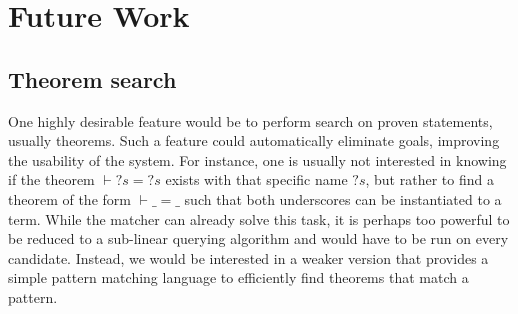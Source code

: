 \section{Future Work}
\label{sec:future-work}

% 

\subsection{Theorem search}

One highly desirable feature would be to perform search on proven statements, usually theorems. Such a feature could automatically eliminate goals, improving the usability of the system. For instance, one is usually not interested in knowing if the theorem $\vdash {?s} = {?s}$ exists with that specific name ${?s}$, but rather to find a theorem of the form $\vdash \_ = \_$ such that both underscores can be instantiated to a term. While the matcher can already solve this task, it is perhaps too powerful to be reduced to a sub-linear querying algorithm and would have to be run on every candidate. Instead, we would be interested in a weaker version that provides a simple pattern matching language to efficiently find theorems that match a pattern.

